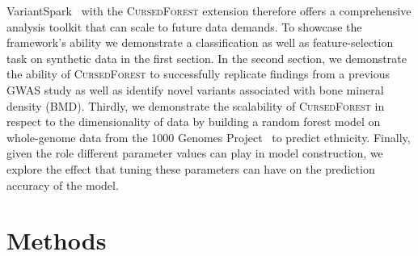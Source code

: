 \documentclass[10pt,letterpaper]{article}
\let\oldmarginpar\marginpar
\renewcommand\marginpar[1]{\-\oldmarginpar[\raggedleft\footnotesize #1]%
{\raggedright\footnotesize #1}}
\newcommand{\cursedforest}{\textsc{CursedForest}\xspace}
\newcommand{\mtry}{\texttt{mtry}\xspace}
\newcommand{\ntree}{\texttt{ntree}\xspace}
\begin{document}

VariantSpark~\cite{OBrien2015} with the \cursedforest extension therefore offers a
comprehensive analysis toolkit that can scale to future data demands. To showcase the framework's ability we demonstrate
a classification as well as feature-selection task on synthetic data in the first section. In the second section, we demonstrate the ability of
\cursedforest to successfully replicate findings from a previous GWAS study as well as identify novel variants associated with bone 
mineral density (BMD). 
Thirdly, we demonstrate the scalability of \cursedforest in respect to the dimensionality of data by building a random
forest model on whole-genome data from the 1000 Genomes Project~\cite{1KG2012} to predict ethnicity.
Finally, given the role different parameter values can play in model construction, we explore the effect that tuning these
parameters can have on the prediction accuracy of the model.



\section{Methods}
\label{section:methods}
\end{document}
